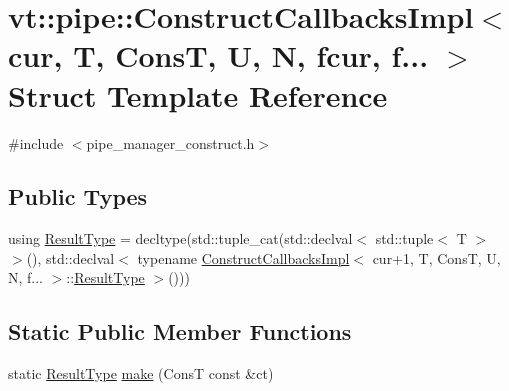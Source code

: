\hypertarget{structvt_1_1pipe_1_1_construct_callbacks_impl_3_01cur_00_01_t_00_01_cons_t_00_01_u_00_01_n_00_01fcur_00_01f_8_8_8_01_4}{}\section{vt\+:\+:pipe\+:\+:Construct\+Callbacks\+Impl$<$ cur, T, ConsT, U, N, fcur, f... $>$ Struct Template Reference}
\label{structvt_1_1pipe_1_1_construct_callbacks_impl_3_01cur_00_01_t_00_01_cons_t_00_01_u_00_01_n_00_01fcur_00_01f_8_8_8_01_4}


{\ttfamily \#include $<$pipe\+\_\+manager\+\_\+construct.\+h$>$}

\subsection*{Public Types}
\begin{DoxyCompactItemize}
\item 
using \hyperlink{structvt_1_1pipe_1_1_construct_callbacks_impl_3_01cur_00_01_t_00_01_cons_t_00_01_u_00_01_n_00_01fcur_00_01f_8_8_8_01_4_a294fdd76c66fb6d0b700474df14313ab}{Result\+Type} = decltype(std\+::tuple\+\_\+cat(std\+::declval$<$ std\+::tuple$<$ T $>$ $>$(), std\+::declval$<$ typename \hyperlink{structvt_1_1pipe_1_1_construct_callbacks_impl}{Construct\+Callbacks\+Impl}$<$ cur+1, T, ConsT, U, N, f... $>$\+::\hyperlink{structvt_1_1pipe_1_1_construct_callbacks_impl_3_01cur_00_01_t_00_01_cons_t_00_01_u_00_01_n_00_01fcur_00_01f_8_8_8_01_4_a294fdd76c66fb6d0b700474df14313ab}{Result\+Type} $>$()))
\end{DoxyCompactItemize}
\subsection*{Static Public Member Functions}
\begin{DoxyCompactItemize}
\item 
static \hyperlink{structvt_1_1pipe_1_1_construct_callbacks_impl_3_01cur_00_01_t_00_01_cons_t_00_01_u_00_01_n_00_01fcur_00_01f_8_8_8_01_4_a294fdd76c66fb6d0b700474df14313ab}{Result\+Type} \hyperlink{structvt_1_1pipe_1_1_construct_callbacks_impl_3_01cur_00_01_t_00_01_cons_t_00_01_u_00_01_n_00_01fcur_00_01f_8_8_8_01_4_a6ba83bfa254c983cb9c1690ccb7714f5}{make} (ConsT const \&ct)
\end{DoxyCompactItemize}



